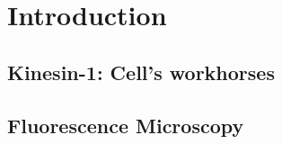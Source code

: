 \section{Introduction}
\subsection{Kinesin-1: Cell's workhorses}

\subsection{Fluorescence Microscopy}